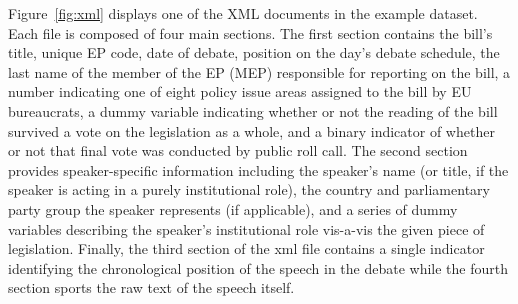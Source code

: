 \documentclass[11pt]{article}
\begin{document}
Figure~\ref{fig:xml} displays one of the XML documents in the example
dataset.  Each file is composed of four main sections.   The first
section contains the bill's title, unique EP code, date of debate,
position on the day's debate schedule, the last name of the member of
the EP (MEP) responsible for reporting on the bill, a number
indicating one of eight policy issue areas assigned to the bill by EU
bureaucrats, a dummy variable indicating whether or not the reading of
the bill survived a vote on the legislation as a whole, and a binary
indicator of whether or not that final vote was conducted by public
roll call.  The second section provides speaker-specific information
including the speaker's name (or title, if the speaker is acting in a
purely institutional role), the country and parliamentary party group
the speaker represents (if applicable), and a series of dummy
variables describing the speaker's institutional role vis-a-vis the
given piece of legislation.  Finally, the third section of the xml
file contains a single indicator identifying the chronological
position of the speech in the debate while the fourth section sports
the raw text of the speech itself.
\end{document}
